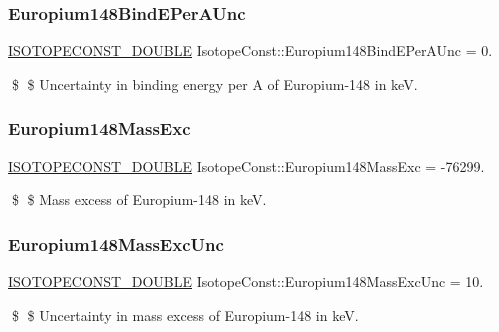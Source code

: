 \subsubsection{\texorpdfstring{Europium148\+Bind\+E\+Per\+A\+Unc}{Europium148BindEPerAUnc}}
{\footnotesize\ttfamily \mbox{\hyperlink{group___isotope_const-_macros_ga8f45a7272ce02c0b4c65c44636ed719a}{I\+S\+O\+T\+O\+P\+E\+C\+O\+N\+S\+T\+\_\+\+D\+O\+U\+B\+LE}} Isotope\+Const\+::\+Europium148\+Bind\+E\+Per\+A\+Unc = 0.}

\$ \$ Uncertainty in binding energy per A of Europium-\/148 in keV. \mbox{\label{group___isotope_const-_europium-_eu148_ga75bb005f0c1c98d8527f68ba9ac2856a}} 
\subsubsection{\texorpdfstring{Europium148\+Mass\+Exc}{Europium148MassExc}}
{\footnotesize\ttfamily \mbox{\hyperlink{group___isotope_const-_macros_ga8f45a7272ce02c0b4c65c44636ed719a}{I\+S\+O\+T\+O\+P\+E\+C\+O\+N\+S\+T\+\_\+\+D\+O\+U\+B\+LE}} Isotope\+Const\+::\+Europium148\+Mass\+Exc = -\/76299.}

\$ \$ Mass excess of Europium-\/148 in keV. \mbox{\label{group___isotope_const-_europium-_eu148_ga082070a74e2ccae77f1c7423f8813651}} 
\subsubsection{\texorpdfstring{Europium148\+Mass\+Exc\+Unc}{Europium148MassExcUnc}}
{\footnotesize\ttfamily \mbox{\hyperlink{group___isotope_const-_macros_ga8f45a7272ce02c0b4c65c44636ed719a}{I\+S\+O\+T\+O\+P\+E\+C\+O\+N\+S\+T\+\_\+\+D\+O\+U\+B\+LE}} Isotope\+Const\+::\+Europium148\+Mass\+Exc\+Unc = 10.}

\$ \$ Uncertainty in mass excess of Europium-\/148 in keV. \mbox{\label{group___isotope_const-_europium-_eu148_ga528bbb1d23931d1df209f76fd6e00657}} 
